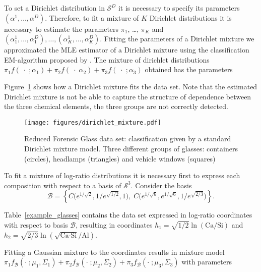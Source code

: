 \documentclass[12pt, a4paper]{article}
\begin{document}
To set a Dirichlet distribution in $\mathcal{S}^D$ it is necessary to specify its parameters $\left( \alpha^1, \dots ,\alpha^D \right)$. Therefore, to fit a mixture of $K$ Dirichlet distributions it is necessary to estimate the parameters $\pi_1$, \dots, $\pi_K$ and $\left( \alpha^1_1, \dots ,\alpha^D_1 \right), \dots, \left( \alpha^1_K, \dots, \alpha^D_K \right)$. Fitting the parameters of a Dirichlet mixture we approximated the MLE estimator of a Dirichlet mixture using the classification EM-algorithm proposed by \cite{celeux1992classification}. The mixture of dirichlet distributions $
\pi_1 f(\;\cdot\; ; \alpha_1) + \pi_2 f(\;\cdot\; \alpha_2) + \pi_3 f(\;\cdot\; ; \alpha_3)
$
obtained has the parameters
{\small  }


Figure~\ref{fig06fittingdirichlet} shows how a Dirichlet mixture fits the data set. Note that the estimated Dirichlet mixture is not be able to capture the structure of dependence between the three chemical elements, the three groups are not correctly detected. 

\begin{figure}[htbp]
\centering
\texttt{[image: figures/dirichlet\_mixture.pdf]}
\caption{Reduced Forensic Glass data set: classification given by a standard Dirichlet mixture model. Three different groups of glasses: containers (circles), headlamps (triangles) and vehicle windows (squares)}
\label{fig06fittingdirichlet}
\end{figure}

To fit a mixture of log-ratio distributions it is necessary first to express each composition with respect to a basis of $\mathcal{S}^3$. Consider the basis 
\[
\mathcal{B} = \left\{ C\Big( e^{1/\sqrt{2}}, 1/e^{\sqrt{1/2}}, 1 \Big), \; C\Big( e^{1/\sqrt{6}}, e^{1/\sqrt{6}}, 1/e^{\sqrt{2/3}} \Big) \right\}.
\]

Table~\ref{example_glasses} contains the data set expressed in log-ratio coordinates with respect to basis $\mathcal{B}$, resulting in coordinates $h_1 = \sqrt{1/2} \ln(\text{Ca}/\text{Si})$ and $h_2 = \sqrt{2/3} \ln(\sqrt{\text{Ca} \cdot \text{Si}} / \text{Al})$.



Fitting a Gaussian mixture to the coordinates results in mixture model
$
\pi_1 f_{\mathcal{B}}(\cdot\;; \mu_1, \Sigma_1) + \pi_2 f_{\mathcal{B}}(\cdot\;; \mu_2, \Sigma_2) + \pi_3 f_{\mathcal{B}}(\cdot\;; \mu_3, \Sigma_3)
$
with parameters

{\small  }
\end{document}
